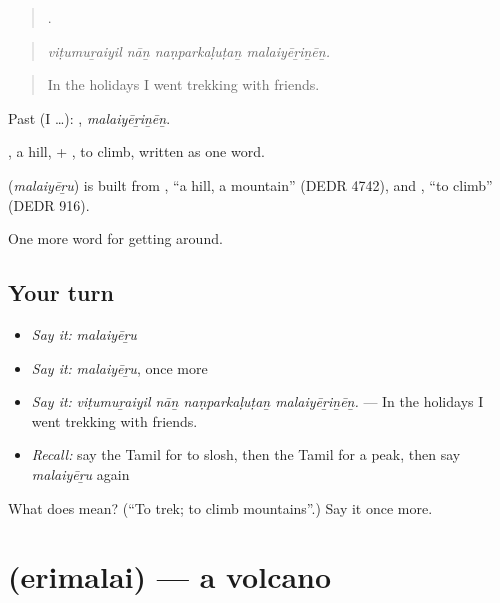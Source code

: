 \begin{quote}
   .
\end{quote}

\begin{quote}
\emph{viṭumuṟaiyil nāṉ naṇparkaḷuṭaṉ malaiyēṟiṉēṉ.}
\end{quote}

\begin{quote}
In the holidays I went trekking with friends.
\end{quote}

Past (I …): , \emph{malaiyēṟiṉēṉ}.

, a hill, + , to climb, written as one word.

\begin{cousinweb}
\textbf{} (\emph{malaiyēṟu}) is built from , \textquotedblleft{}a hill, a mountain\textquotedblright{} (DEDR 4742), and , \textquotedblleft{}to climb\textquotedblright{} (DEDR 916).
\end{cousinweb}

\begin{grammarlens}[title={What you've built}]
One more word for getting around.
\end{grammarlens}

\subsection*{Your turn}
\begin{itemize}
\raggedright
  \item \emph{Say it:} \emph{malaiyēṟu}
  \item \emph{Say it:} \emph{malaiyēṟu}, once more
  \item \emph{Say it:} \emph{viṭumuṟaiyil nāṉ naṇparkaḷuṭaṉ malaiyēṟiṉēṉ.} — In the holidays I went trekking with friends.
  \item \emph{Recall:} say the Tamil for to slosh, then the Tamil for a peak, then say \emph{malaiyēṟu} again
\end{itemize}

\begin{tcolorbox}[breakable,colback=teal!4,colframe=teal!35!black,title={Before you move on}]
What does  mean? (\textquotedblleft{}To trek; to climb mountains\textquotedblright{}.) Say it once more.
\end{tcolorbox}
\section[\texorpdfstring{\ta{எரிமலை} (erimalai)}{எரிமலை (erimalai)}]{ (erimalai) — a volcano}

